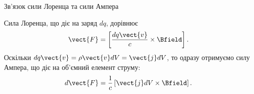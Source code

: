 \documentclass{beamer}
\begin{document}
\begin{frame}{Зв'язок сили Лоренца та сили Ампера}{}
	\begin{block}{}
		Сила Лоренца, що діє на заряд $dq$, дорівнює
		\begin{equation*}
			\vect{F} = \left[\frac{dq \vect{v}}{c}\times\Bfield\right].
		\end{equation*}
		Оскільки $dq \vect{v} = \rho \vect{v} dV = \vect{j} dV$, то одразу отримуємо силу Ампера, що діє на об'ємний елемент струму:
		\begin{equation*}
			d\vect{F} = \frac1c \left[ \vect{j}dV \times \Bfield\right].
		\end{equation*}
	\end{block}
\end{frame}
\end{document}
